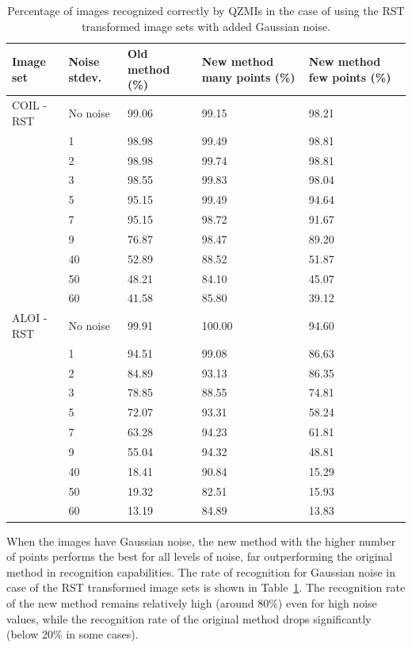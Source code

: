 \begin{table}[tbp]
    \centering
    \begin{tabular}{|p{2.15cm}|p{1.8cm}|p{3cm}|p{2.74cm}|p{2.6cm}|} \hline
        \textbf{Image set} & \textbf{Noise stdev.} & \textbf{Old method} (\%) & \textbf{New method} many points (\%)& \textbf{New method} few points (\%) \\ \hline\hline
        COIL - RST & No noise & 99.06 & 99.15 & 98.21 \\ \cline{2-5}
        & 1 & 98.98 & 99.49 & 98.81 \\ \cline{2-5}
        & 2 & 98.98 & 99.74 & 98.81 \\ \cline{2-5}
        & 3 & 98.55 & 99.83 & 98.04 \\ \cline{2-5}
        & 5 & 95.15 & 99.49 & 94.64 \\ \cline{2-5}
        & 7 & 95.15 & 98.72 & 91.67 \\ \cline{2-5}
        & 9 & 76.87 & 98.47 & 89.20 \\ \cline{2-5}
        & 40 & 52.89 & 88.52 & 51.87 \\ \cline{2-5}
        & 50 & 48.21 & 84.10 & 45.07 \\ \cline{2-5}
        & 60 & 41.58 & 85.80 & 39.12 \\ \hline\hline
        ALOI - RST & No noise & 99.91 & 100.00 & 94.60 \\ \cline{2-5}
        & 1 & 94.51 & 99.08 & 86.63 \\ \cline{2-5}
        & 2 & 84.89 & 93.13 & 86.35 \\ \cline{2-5}
        & 3 & 78.85 & 88.55 & 74.81 \\ \cline{2-5}
        & 5 & 72.07 & 93.31 & 58.24 \\ \cline{2-5}
        & 7 & 63.28 & 94.23 & 61.81 \\ \cline{2-5}
        & 9 & 55.04 & 94.32 & 48.81 \\ \cline{2-5}
        & 40 & 18.41 & 90.84 & 15.29 \\ \cline{2-5}
        & 50 & 19.32 & 82.51 & 15.93 \\ \cline{2-5}
        & 60 & 13.19 & 84.89 & 13.83 \\ \cline{1-5}
    \end{tabular}
    \caption{Percentage of images recognized correctly by QZMIs in the case of using the RST transformed image sets with added Gaussian noise.}
    \label{tab:recognition_gauss}
\end{table}
When the images have Gaussian noise, the new method with the higher number of points performs the best for all levels of noise, far outperforming the original method in recognition capabilities. 
The rate of recognition for Gaussian noise in case of the RST transformed image sets is shown in Table~\ref{tab:recognition_gauss}. The recognition rate of the new method remains relatively high (around 80\%) even for high noise values, while the recognition rate of the original method drops significantly (below 20\% in some cases).

